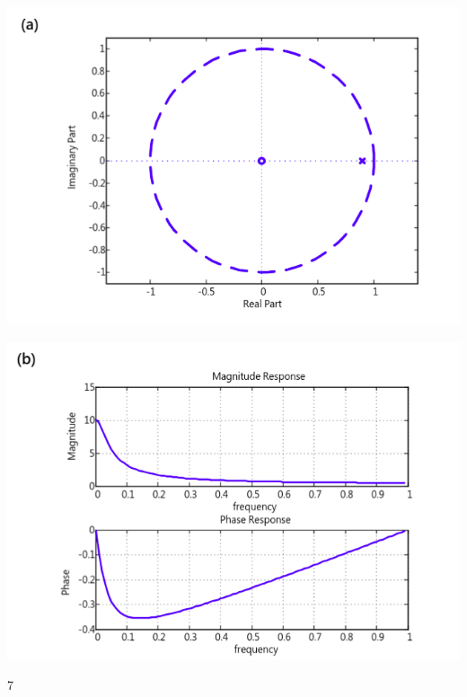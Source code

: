 \documentclass[a4paper]{article}
\begin{document}
	
	\begin{center}
		\includegraphics[width=1\linewidth]{screenshot061}
	\end{center}
	
	
	\begin{center}
		\includegraphics[width=1\linewidth]{screenshot062}
	\end{center}
	7
\newpage

\end{document}
